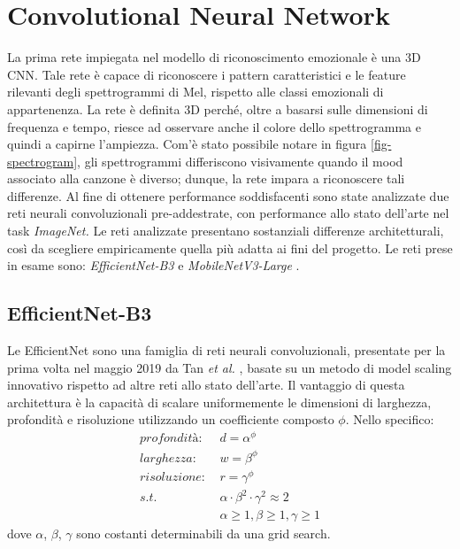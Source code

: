 \documentclass[11pt]{report}
\begin{document}
\section{Convolutional Neural Network}

La prima rete impiegata nel modello di riconoscimento emozionale è una 3D CNN. Tale rete è capace di riconoscere i pattern caratteristici e le feature rilevanti degli spettrogrammi di Mel, rispetto alle classi emozionali di appartenenza. La rete è definita 3D perché, oltre a basarsi sulle dimensioni di frequenza e tempo, riesce ad osservare anche il colore dello spettrogramma e quindi a capirne l'ampiezza. Com'è stato possibile notare in figura \ref{fig-spectrogram}, gli spettrogrammi differiscono visivamente quando il mood associato alla canzone è diverso; dunque, la rete impara a riconoscere tali differenze.
Al fine di ottenere performance soddisfacenti sono state analizzate due reti neurali convoluzionali pre-addestrate, con performance allo stato dell'arte nel task \textit{ImageNet.} Le reti analizzate presentano sostanziali differenze architetturali, così da scegliere empiricamente quella più adatta ai fini del progetto. Le reti prese in esame sono: \textit{EfficientNet-B3} \cite{tan2019efficientnet} e \textit{MobileNetV3-Large} \cite{howard2019searching}.

\newpage

\subsection{EfficientNet-B3}


Le EfficientNet sono una famiglia di reti neurali convoluzionali, presentate per la prima volta nel maggio 2019 da Tan \textit{et al.} \cite{tan2019efficientnet}, basate su un metodo di model scaling innovativo rispetto ad altre reti allo stato dell'arte. Il vantaggio di questa architettura è la capacità di scalare uniformemente le dimensioni di larghezza, profondità e risoluzione utilizzando un coefficiente composto $\phi$. Nello specifico:
        \begin{equation}
            \begin{split}
                profondità:&\ d = \alpha^\phi\\
                larghezza:&\ w = \beta^\phi\\
                risoluzione:&\  r = \gamma^\phi\\
                s.t.&\ \alpha \cdot \beta^2 \cdot \gamma^2 \approx 2\\
                &\ \alpha\geq1, \beta\geq1, \gamma\geq1
            \end{split}
        \end{equation}
        dove $\alpha$, $\beta$, $\gamma$ sono costanti determinabili da una grid search.\\
        
\end{document}
